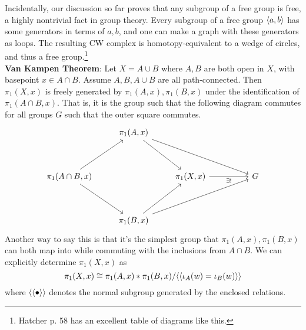 \documentclass{amsart}
\begin{document}
	 Incidentally, our discussion so far proves that any subgroup of a free group is free, a highly nontrivial fact in group theory. Every subgroup of a free group $\langle a,b\rangle$ has some generators in terms of $a,b$, and one can make a graph with these generators as loops. The resulting CW complex is homotopy-equivalent to a wedge of circles, and thus a free group.\footnote{Hatcher p. 58 has an excellent table of diagrams like this.}\\
	 
	 \textbf{Van Kampen Theorem}: Let $X=A\cup B$ where $A,B$ are both open in $X$, with basepoint $x\in A\cap B$. Assume $A,B,A\cup B$ are all path-connected. Then $\pi_1(X,x)$ is freely generated by $\pi_1(A,x),\pi_1(B,x)$ under the identification of $\pi_1(A\cap B,x)$. That is, it is the group such that the following diagram commutes for all groups $G$ such that the outer square commutes.
	 $$
	 \begin{tikzcd}
	 	& {\pi_1(A,x)} \\
	 	\\
	 	{\pi_1(A\cap B,x)} && {\pi_1(X,x)} && G \\
	 	\\
	 	& {\pi_1(B,x)}
	 	\arrow[from=1-2, to=3-3]
	 	\arrow[from=1-2, to=3-5]
	 	\arrow[from=3-1, to=1-2]
	 	\arrow[from=3-1, to=5-2]
	 	\arrow["{\exists!}"', from=3-3, to=3-5]
	 	\arrow[from=5-2, to=3-3]
	 	\arrow[from=5-2, to=3-5]
	 \end{tikzcd}
	 $$
	 Another way to say this is that it's the simplest group that $\pi_1(A,x),\pi_1(B,x)$ can both map into while commuting with the inclusions from $A\cap B$. We can explicitly determine $\pi_1(X,x)$ as 
	 $$
	 \pi_1(X,x)\cong \pi_1(A,x)\ast \pi_1(B,x) / \langle\langle \iota_A(w) = \iota_B(w)\rangle\rangle
	 $$
	 where $\langle\langle\bullet \rangle\rangle$ denotes the normal subgroup generated by the enclosed relations.
	 
\end{document}
